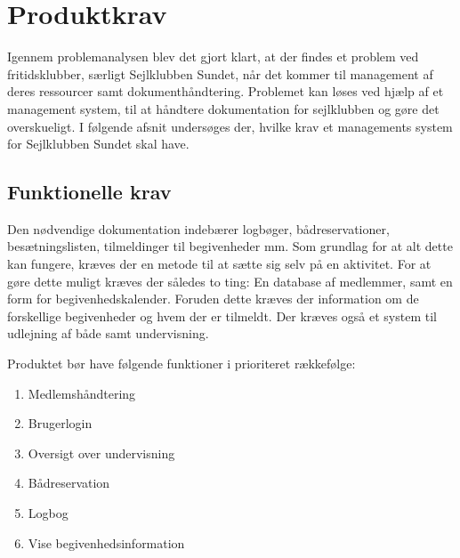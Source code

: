 \chapter{Produktkrav}

Igennem problemanalysen blev det gjort klart, at der findes et problem ved fritidsklubber, særligt Sejlklubben Sundet, når det kommer til management af deres ressourcer samt dokumenthåndtering. 
Problemet kan løses ved hjælp af et management system, til at håndtere dokumentation for sejlklubben og gøre det overskueligt. 
I følgende afsnit undersøges der, hvilke krav et managements system for Sejlklubben Sundet skal have. 


\section{Funktionelle krav} \label{sec:funktionelleKrav}

Den nødvendige dokumentation indebærer logbøger, bådreservationer, besætningslisten, tilmeldinger til begivenheder mm. 
Som grundlag for at alt dette kan fungere, kræves der en metode til at sætte sig selv på en aktivitet. 
For at gøre dette muligt kræves der således to ting: En database af medlemmer, samt en form for begivenhedskalender.
Foruden dette kræves der information om de forskellige begivenheder og hvem der er tilmeldt. 
Der kræves også et system til udlejning af både samt undervisning.

Produktet bør have følgende funktioner i prioriteret rækkefølge:
\begin{enumerate}
  \item Medlemshåndtering
  \item Brugerlogin
  \item Oversigt over undervisning 
  \item Bådreservation
  \item Logbog
  \item Vise begivenhedsinformation 
\end{enumerate}


